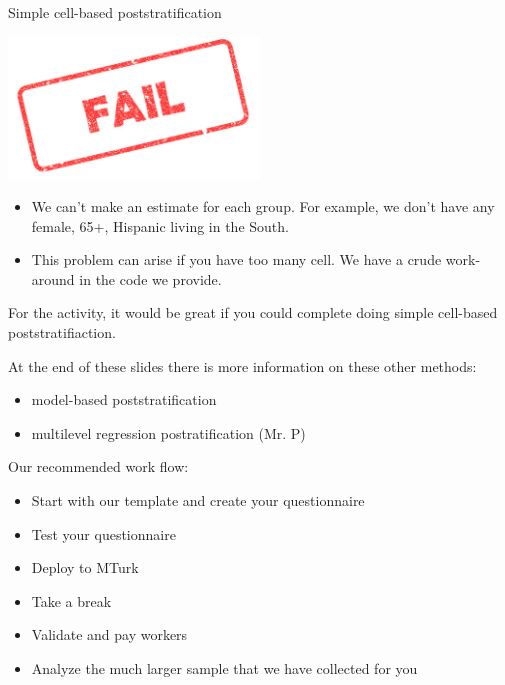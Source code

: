 \documentclass[aspectratio=169]{beamer}
\begin{document}
\begin{frame}{Simple cell-based poststratification}

\begin{center}
\includegraphics[width=0.5\textwidth]{figures/fail}
\end{center}

\vfill

\begin{itemize}
\item We can't make an estimate for each group.  For example, we don't have any female, 65+, Hispanic living in the South. \pause
\item This problem can arise if you have too many cell.  We have a crude work-around in the code we provide. 
\end{itemize}

\end{frame}
\begin{frame}

For the activity, it would be great if you could complete doing simple cell-based poststratifiaction.  

At the end of these slides there is more information on these other methods:
\begin{itemize}
\item model-based poststratification
\item multilevel regression postratification (Mr. P)
\end{itemize}

\end{frame}
\begin{frame}

Our recommended work flow:
\begin{itemize}
\item Start with our template and create your questionnaire
\item Test your questionnaire
\item Deploy to MTurk
\item Take a break
\item Validate and pay workers
\item Analyze the much larger sample that we have collected for you
\end{itemize}

\end{frame}
\end{document}
